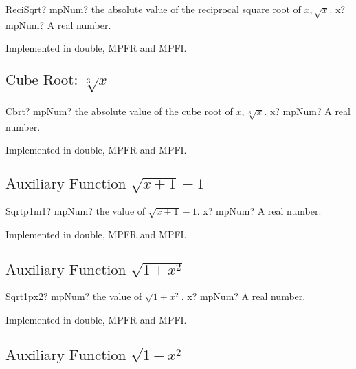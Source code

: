 \begin{mpFunctionsExtract}
	\mpFunctionOne
	{ReciSqrt? mpNum? the absolute value of the reciprocal square root of $x, \sqrt{x}$.}
	{x? mpNum? A real number.}
\end{mpFunctionsExtract}

Implemented in double, MPFR and MPFI.



\subsection{\texorpdfstring{$\text{Cube Root: }\sqrt[3]{x}$}{Cbrt}}

\begin{mpFunctionsExtract}
	\mpFunctionOne
	{Cbrt? mpNum? the absolute value of the cube root of $x, \sqrt[3]{x}$.}
	{x? mpNum? A real number.}
\end{mpFunctionsExtract}

Implemented in double, MPFR and MPFI.



\subsection{\texorpdfstring{$\text{Auxiliary Function }\sqrt{x+1}-1$}{sqrtp1m1}}

\begin{mpFunctionsExtract}
	\mpFunctionOne
	{Sqrtp1m1? mpNum? the value of $\sqrt{x+1}-1$.}
	{x? mpNum? A real number.}
\end{mpFunctionsExtract}

Implemented in double, MPFR and MPFI.



\subsection{\texorpdfstring{$\text{Auxiliary Function }\sqrt{1+x^2}$}{sqrt1px2}}

\begin{mpFunctionsExtract}
	\mpFunctionOne
	{Sqrt1px2? mpNum? the value of $\sqrt{1+x^2}$.}
	{x? mpNum? A real number.}
\end{mpFunctionsExtract}

Implemented in double, MPFR and MPFI.



\subsection{\texorpdfstring{$\text{Auxiliary Function }\sqrt{1-x^2}$}{sqrt1mx2}}

